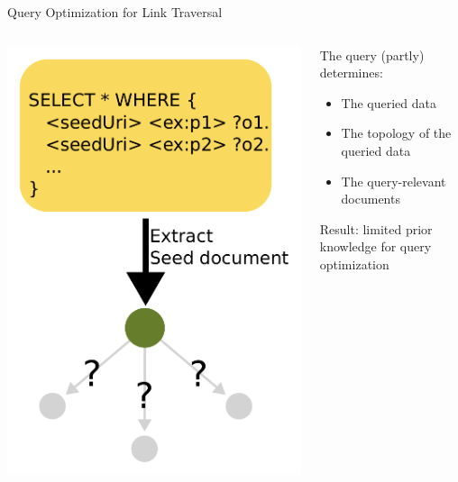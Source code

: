 
\begin{frame}{Query Optimization for Link Traversal}
    \begin{columns}[T] %
        \begin{column}{0.6\textwidth} %
            \includegraphics[width=.60\linewidth]{images/hardToOptimizeLTQP.pdf} %
        \end{column}

        \begin{column}{0.4\textwidth}
            The query (partly) determines:
            \begin{itemize}
                \item The queried data
                \item The topology of the queried data
                \item The query-relevant documents
            \end{itemize}
            Result: limited prior knowledge for query optimization
        \end{column}
    \end{columns}
\end{frame}

